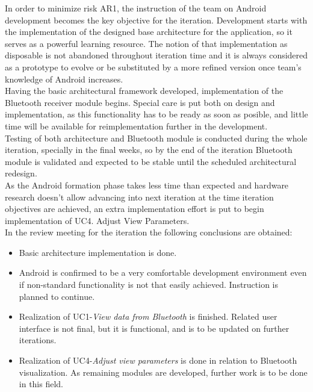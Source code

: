 			In order to minimize risk AR1, the instruction of the team on Android development becomes the key objective for the iteration. Development starts with the implementation of the designed base architecture for the application, so it serves as a powerful learning resource. The notion of that implementation as disposable is not abandoned throughout iteration time and it is always considered as a prototype to evolve or be substituted by a more refined version once team's knowledge of Android increases.\\

			Having the basic architectural framework developed, implementation of the Bluetooth receiver module begins. Special care is put both on design and implementation, as this functionality has to be ready as soon as posible, and little time will be available for reimplementation further in the development.\\

			Testing of both architecture and Bluetooth module is conducted during the whole iteration, specially in the final weeks, so by the end of the iteration Bluetooth module is validated and expected to be stable until the scheduled architectural redesign.\\

			As the Android formation phase takes less time than expected and hardware research doesn't allow advancing into next iteration at the time iteration objectives are achieved, an extra implementation effort is put to begin implementation of UC4. Adjust View Parameters.\\

			In the review meeting for the iteration the following conclusions are obtained:
			\begin{itemize}
				\item Basic architecture implementation is done.
				\item Android is confirmed to be a very comfortable development environment even if non-standard functionality is not that easily achieved. Instruction is planned to continue.
				\item Realization of UC1-\emph{View data from Bluetooth} is finished. Related user interface is not final, but it is functional, and is to be updated on further iterations.
				\item Realization of UC4-\emph{Adjust view parameters} is done in relation to Bluetooth visualization. As remaining modules are developed, further work is to be done in this field.
			\end{itemize}

